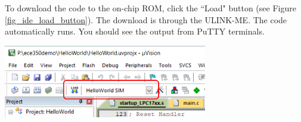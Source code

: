 To download the code to the on-chip ROM, click the ``Load" button (see Figure \ref{fig_ide_load_button}). 
The download is through the ULINK-ME. The code automatically runs. You should see the output from PuTTY terminals.\par
  \begin{minipage}{\linewidth}
    \centering
    \includegraphics[width=3.5in]{figure/uv5/IDE_load_button}
    \label{fig_ide_load_button}
  \end{minipage}

